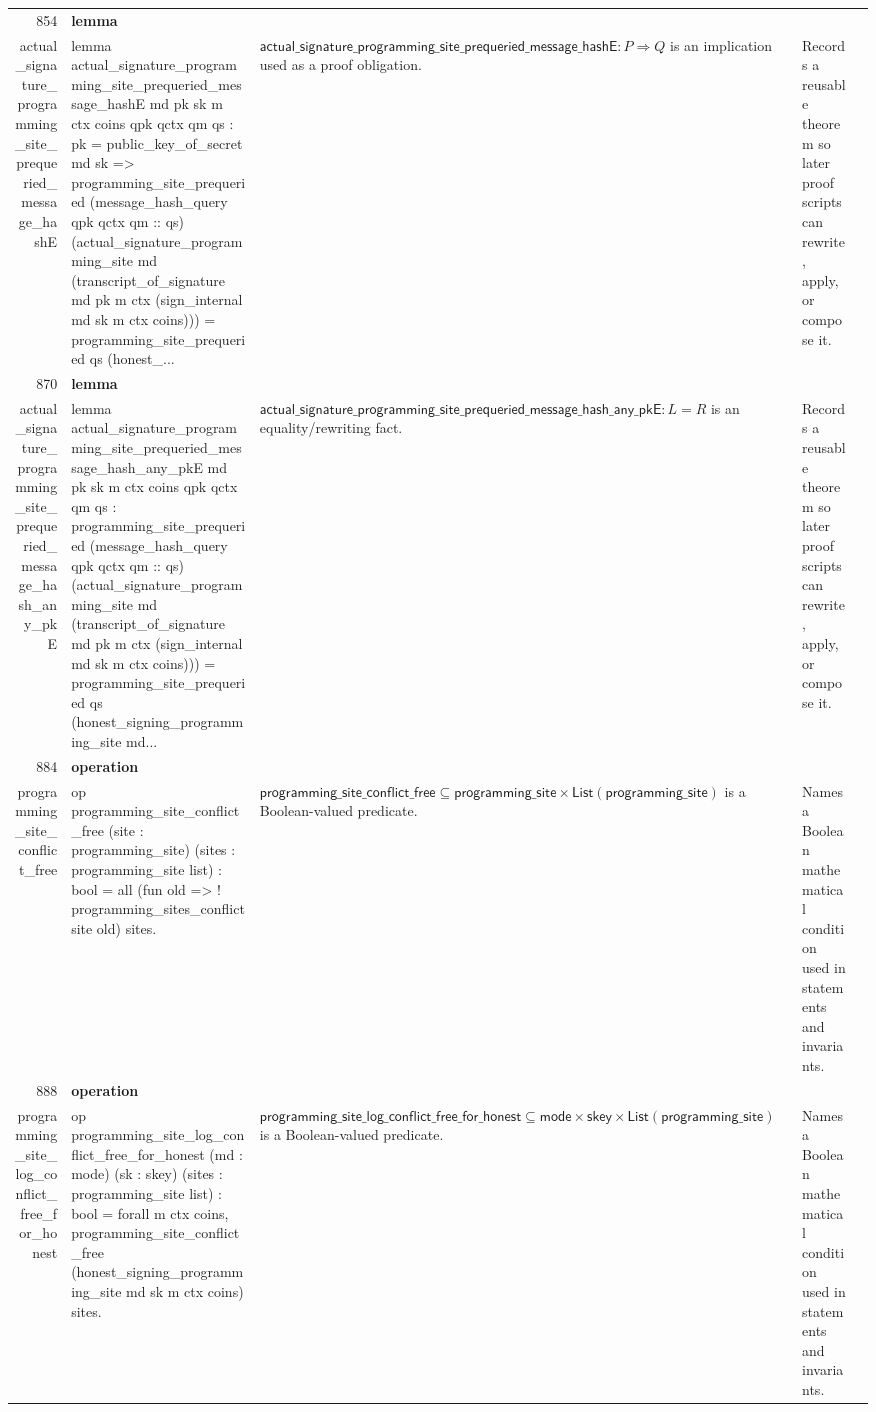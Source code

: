 \documentclass[10pt]{article}
\newcommand{\ec}[1]{\begingroup\ttfamily\scriptsize #1\endgroup}
\begin{document}
\begin{longtable}{r L{0.17\textwidth} L{0.26\textwidth} L{0.27\textwidth} L{0.20\textwidth}}
854 & \textbf{lemma}\\\ec{actual\_signature\_programming\_site\_prequeried\_message\_hashE} & \ec{lemma actual\_signature\_programming\_site\_prequeried\_message\_hashE md pk sk m ctx coins qpk qctx qm qs : pk = public\_key\_of\_secret md sk => programming\_site\_prequeried (message\_hash\_query qpk qctx qm :: qs) (actual\_signature\_programming\_site md (transcript\_of\_signature md pk m ctx (sign\_internal md sk m ctx coins))) = programming\_site\_prequeried qs (honest\_...} & \(\mathsf{actual\_signature\_programming\_site\_prequeried\_message\_hashE} : P \Rightarrow Q\) is an implication used as a proof obligation. & Records a reusable theorem so later proof scripts can rewrite, apply, or compose it. \\
870 & \textbf{lemma}\\\ec{actual\_signature\_programming\_site\_prequeried\_message\_hash\_any\_pkE} & \ec{lemma actual\_signature\_programming\_site\_prequeried\_message\_hash\_any\_pkE md pk sk m ctx coins qpk qctx qm qs : programming\_site\_prequeried (message\_hash\_query qpk qctx qm :: qs) (actual\_signature\_programming\_site md (transcript\_of\_signature md pk m ctx (sign\_internal md sk m ctx coins))) = programming\_site\_prequeried qs (honest\_signing\_programming\_site md...} & \(\mathsf{actual\_signature\_programming\_site\_prequeried\_message\_hash\_any\_pkE} : L = R\) is an equality/rewriting fact. & Records a reusable theorem so later proof scripts can rewrite, apply, or compose it. \\
884 & \textbf{operation}\\\ec{programming\_site\_conflict\_free} & \ec{op programming\_site\_conflict\_free (site : programming\_site) (sites : programming\_site list) : bool = all (fun old => ! programming\_sites\_conflict site old) sites.} & \(\mathsf{programming\_site\_conflict\_free} \subseteq \mathsf{programming\_site} \times \mathsf{List}(\mathsf{programming\_site})\) is a Boolean-valued predicate. & Names a Boolean mathematical condition used in statements and invariants. \\
888 & \textbf{operation}\\\ec{programming\_site\_log\_conflict\_free\_for\_honest} & \ec{op programming\_site\_log\_conflict\_free\_for\_honest (md : mode) (sk : skey) (sites : programming\_site list) : bool = forall m ctx coins, programming\_site\_conflict\_free (honest\_signing\_programming\_site md sk m ctx coins) sites.} & \(\mathsf{programming\_site\_log\_conflict\_free\_for\_honest} \subseteq \mathsf{mode} \times \mathsf{skey} \times \mathsf{List}(\mathsf{programming\_site})\) is a Boolean-valued predicate. & Names a Boolean mathematical condition used in statements and invariants. \\

\end{longtable}
\end{document}

